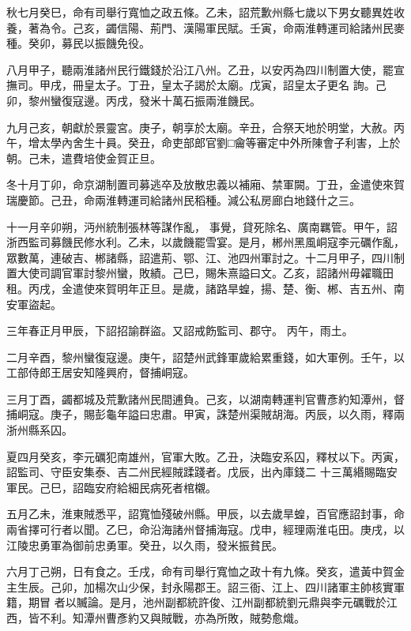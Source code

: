 \begin{pinyinscope}
 秋七月癸巳，命有司舉行寬恤之政五條。乙未，詔荒歉州縣七歲以下男女聽異姓收養，著為令。己亥，蠲信陽、荊門、漢陽軍民賦。壬寅，命兩淮轉運司給諸州民麥種。癸卯，募民以振饑免役。



 八月甲子，聽兩淮諸州民行鐵錢於沿江八州。乙丑，以安丙為四川制置大使，罷宣撫司。甲戌，冊皇太子。丁丑，皇太子謁於太廟。戊寅，詔皇太子更名
 詢。己卯，黎州蠻復寇邊。丙戌，發米十萬石振兩淮饑民。



 九月己亥，朝獻於景靈宮。庚子，朝享於太廟。辛丑，合祭天地於明堂，大赦。丙午，增太學內舍生十員。癸丑，命吏部郎官劉□龠等審定中外所陳會子利害，上於朝。己未，遣費培使金賀正旦。



 冬十月丁卯，命京湖制置司募逃卒及放散忠義以補廂、禁軍闕。丁丑，金遣使來賀瑞慶節。己丑，命兩淮轉運司給諸州民稻種。減公私房廊白地錢什之三。



 十一月辛卯朔，沔州統制張林等謀作亂，
 事覺，貸死除名、廣南羈管。甲午，詔浙西監司募饑民修水利。乙未，以歲饑罷雪宴。是月，郴州黑風峒寇李元礪作亂，眾數萬，連破吉、郴諸縣，詔遣荊、鄂、江、池四州軍討之。十二月甲子，四川制置大使司調官軍討黎州蠻，敗績。己巳，賜朱熹謚曰文。乙亥，詔諸州毋糴職田租。丙戌，金遣使來賀明年正旦。是歲，諸路旱蝗，揚、楚、衡、郴、吉五州、南安軍盜起。



 三年春正月甲辰，下詔招諭群盜。又詔戒飭監司、郡守。
 丙午，雨土。



 二月辛酉，黎州蠻復寇邊。庚午，詔楚州武鋒軍歲給累重錢，如大軍例。壬午，以工部侍郎王居安知隆興府，督捕峒寇。



 三月丁酉，蠲都城及荒歉諸州民間逋負。己亥，以湖南轉運判官曹彥約知潭州，督捕峒寇。庚子，賜彭龜年謚曰忠肅。甲寅，誅楚州渠賊胡海。丙辰，以久雨，釋兩浙州縣系囚。



 夏四月癸亥，李元礪犯南雄州，官軍大敗。乙丑，決臨安系囚，釋杖以下。丙寅，詔監司、守臣安集泰、吉二州民經賊蹂踐者。戊辰，出內庫錢二
 十三萬緡賜臨安軍民。己巳，詔臨安府給細民病死者棺櫬。



 五月乙未，淮東賊悉平，詔寬恤殘破州縣。甲辰，以去歲旱蝗，百官應詔封事，命兩省擇可行者以聞。乙巳，命沿海諸州督捕海寇。戊申，經理兩淮屯田。庚戌，以江陵忠勇軍為御前忠勇軍。癸丑，以久雨，發米振貧民。



 六月丁己朔，日有食之。壬戌，命有司舉行寬恤之政十有九條。癸亥，遣黃中賀金主生辰。己卯，加楊次山少保，封永陽郡王。詔三衙、江上、四川諸軍主帥核實軍籍，期冒
 者以贓論。是月，池州副都統許俊、江州副都統劉元鼎與李元礪戰於江西，皆不利。知潭州曹彥約又與賊戰，亦為所敗，賊勢愈熾。




\end{pinyinscope}
